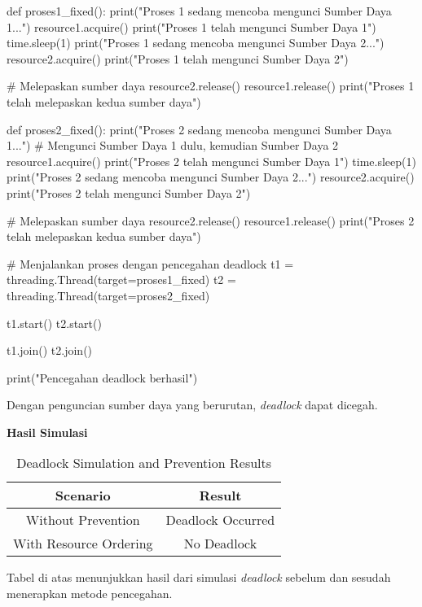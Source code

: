 \documentclass[12pt]{article}
\begin{document}
\begin{python}
def proses1_fixed():
    print("Proses 1 sedang mencoba mengunci Sumber Daya 1...")
    resource1.acquire()
    print("Proses 1 telah mengunci Sumber Daya 1")
    time.sleep(1)
    print("Proses 1 sedang mencoba mengunci Sumber Daya 2...")
    resource2.acquire()
    print("Proses 1 telah mengunci Sumber Daya 2")
    
    # Melepaskan sumber daya
    resource2.release()
    resource1.release()
    print("Proses 1 telah melepaskan kedua sumber daya")

def proses2_fixed():
    print("Proses 2 sedang mencoba mengunci Sumber Daya 1...")  # Mengunci Sumber Daya 1 dulu, kemudian Sumber Daya 2
    resource1.acquire()
    print("Proses 2 telah mengunci Sumber Daya 1")
    time.sleep(1)
    print("Proses 2 sedang mencoba mengunci Sumber Daya 2...")
    resource2.acquire()
    print("Proses 2 telah mengunci Sumber Daya 2")
    
    # Melepaskan sumber daya
    resource2.release()
    resource1.release()
    print("Proses 2 telah melepaskan kedua sumber daya")

# Menjalankan proses dengan pencegahan deadlock
t1 = threading.Thread(target=proses1_fixed)
t2 = threading.Thread(target=proses2_fixed)

t1.start()
t2.start()

t1.join()
t2.join()

print("Pencegahan deadlock berhasil")
\end{python}

Dengan penguncian sumber daya yang berurutan, \textit{deadlock} dapat dicegah.

\textbf{Hasil Simulasi}

\begin{table}[htbp]
    \centering
    \begin{tabular}{|c|c|}
    \hline
    \textbf{Scenario} & \textbf{Result} \\
    \hline
    Without Prevention & Deadlock Occurred \\
    \hline
    With Resource Ordering & No Deadlock \\
    \hline
    \end{tabular}
    \caption{Deadlock Simulation and Prevention Results}
    \label{tab:deadlock}
\end{table}

Tabel di atas menunjukkan hasil dari simulasi \textit{deadlock} sebelum dan sesudah menerapkan metode pencegahan.
\end{document}
